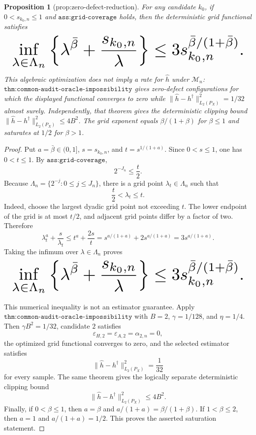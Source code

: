 \documentclass{article}
\newtheorem{proposition}{Proposition}
\begin{document}
\begin{proposition}[prop:zero-defect-reduction]\label{prop:zero-defect-reduction}
For any candidate \(k_0\), if \(0<s_{k_0,n}\le1\) and \(\texttt{ass:grid-coverage}\) holds, then the deterministic grid functional satisfies
\[
\makebox[\linewidth][c]{\resizebox{0.98\linewidth}{!}{\(\displaystyle \inf_{\lambda\in\Lambda_n}
 \left\{\lambda^{\bar\beta}+\frac{s_{k_0,n}}{\lambda}\right\}
 \le3s_{k_0,n}^{\bar\beta/(1+\bar\beta)}.\)}}
\]
This algebraic optimization does not imply a rate for \(\widehat h\) under \(\mathcal M_n\): \(\texttt{thm:common-audit-oracle-impossibility}\) gives zero-defect configurations for which the displayed functional converges to zero while \(\|\widehat h-h^\dagger\|_{L_2(P_X)}^2=1/32\) almost surely. Independently, that theorem gives the deterministic clipping bound \(\|\widehat h-h^\dagger\|_{L_2(P_X)}^2\le4B^2\). The grid exponent equals \(\beta/(1+\beta)\) for \(\beta\le1\) and saturates at \(1/2\) for \(\beta>1\).
\end{proposition}
\begin{proof}
Put \(a=\bar\beta\in(0,1]\), \(s=s_{k_0,n}\), and \(t=s^{1/(1+a)}\). Since \(0<s\le1\), one has \(0<t\le1\). By \(\texttt{ass:grid-coverage}\),
\[
 2^{-J_n}\le \frac{t}{2}.
\]
Because \(\Lambda_n=\{2^{-j}:0\le j\le J_n\}\), there is a grid point \(\lambda_t\in\Lambda_n\) such that
\[
 \frac{t}{2}<\lambda_t\le t.
\]
Indeed, choose the largest dyadic grid point not exceeding \(t\). The lower endpoint of the grid is at most \(t/2\), and adjacent grid points differ by a factor of two. Therefore
\[
 \lambda_t^a+\frac{s}{\lambda_t}
 \le t^a+\frac{2s}{t}
 =s^{a/(1+a)}+2s^{a/(1+a)}
 =3s^{a/(1+a)}.
\]
Taking the infimum over \(\lambda\in\Lambda_n\) proves
\[
\makebox[\linewidth][c]{\resizebox{0.98\linewidth}{!}{\(\displaystyle \inf_{\lambda\in\Lambda_n}
 \left\{\lambda^{\bar\beta}+\frac{s_{k_0,n}}{\lambda}\right\}
 \le3s_{k_0,n}^{\bar\beta/(1+\bar\beta)}.\)}}
\]

This numerical inequality is not an estimator guarantee. Apply \(\texttt{thm:common-audit-oracle-impossibility}\) with \(B=2\), \(\gamma=1/128\), and \(\eta=1/4\). Then \(\gamma B^2=1/32\), candidate \(2\) satisfies
\[
 \varepsilon_{H,2}=\varepsilon_{A,2}=\alpha_{2,n}=0,
\]
the optimized grid functional converges to zero, and the selected estimator satisfies
\[
 \|\widehat h-h^\dagger\|_{L_2(P_X)}^2=\frac{1}{32}
\]
for every sample. The same theorem gives the logically separate deterministic clipping bound
\[
 \|\widehat h-h^\dagger\|_{L_2(P_X)}^2\le4B^2.
\]
Finally, if \(0<\beta\le1\), then \(a=\beta\) and \(a/(1+a)=\beta/(1+\beta)\). If \(1<\beta\le2\), then \(a=1\) and \(a/(1+a)=1/2\). This proves the asserted saturation statement.
\end{proof}
\end{document}
